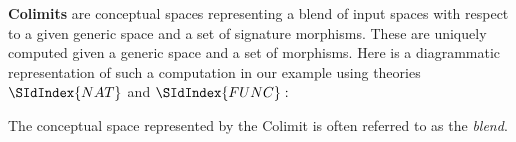 {\bf Colimits} are conceptual spaces representing a blend of input
spaces with respect to a given generic space and a set of signature
morphisms. These are uniquely computed given a generic space and a set of
morphisms. Here is a diagrammatic representation of such a computation
in our example using theories $\SIdIndex{NAT}$ and $\SIdIndex{FUNC}:$
\begin{center}
\end{center}
The conceptual space represented by the Colimit is often referred to
as the {\em blend}. 

